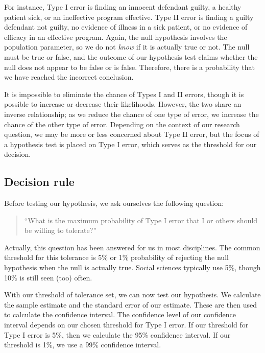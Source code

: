 \documentclass[
]{book}
\begin{document}
For instance, Type I error is finding an innocent defendant guilty, a healthy patient sick, or an ineffective program effective. Type II error is finding a guilty defendant not guilty, no evidence of illness in a sick patient, or no evidence of efficacy in an effective program. Again, the null hypothesis involves the population parameter, so we do not \emph{know} if it is actually true or not. The null must be true or false, and the outcome of our hypothesis test claims whether the null does not appear to be false or is false. Therefore, there is a probability that we have reached the incorrect conclusion.

It is impossible to eliminate the chance of Types I and II errors, though it is possible to increase or decrease their likelihoods. However, the two share an inverse relationship; as we reduce the chance of one type of error, we increase the chance of the other type of error. Depending on the context of our research question, we may be more or less concerned about Type II error, but the focus of a hypothesis test is placed on Type I error, which serves as the threshold for our decision.

\hypertarget{decision-rule}{%
\subsection{Decision rule}\label{decision-rule}}

Before testing our hypothesis, we ask ourselves the following question:

\begin{quote}
``What is the maximum probability of Type I error that I or others should be willing to tolerate?''
\end{quote}

Actually, this question has been answered for us in most disciplines. The common threshold for this tolerance is 5\% or 1\% probability of rejecting the null hypothesis when the null is actually true. Social sciences typically use 5\%, though 10\% is still seen (too) often.

With our threshold of tolerance set, we can now test our hypothesis. We calculate the sample estimate and the standard error of our estimate. These are then used to calculate the confidence interval. The confidence level of our confidence interval depends on our chosen threshold for Type I error. If our threshold for Type I error is 5\%, then we calculate the 95\% confidence interval. If our threshold is 1\%, we use a 99\% confidence interval.
\end{document}
